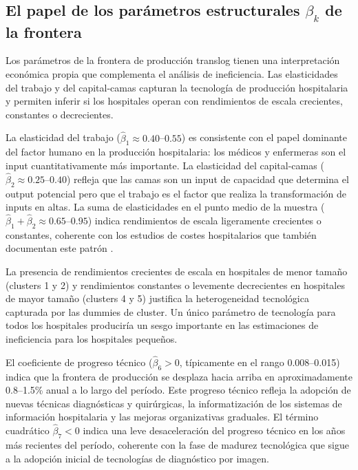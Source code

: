 \documentclass[12pt, a4paper, twoside, openright]{book}
\theoremstyle{plain}
\theoremstyle{definition}
\theoremstyle{remark}
\begin{document}
\subsection{El papel de los parámetros estructurales \texorpdfstring{$\beta_k$}{beta\_k} de la frontera}

Los parámetros de la frontera de producción translog tienen una interpretación económica propia que complementa el análisis de ineficiencia. Las elasticidades del trabajo y del capital-camas capturan la tecnología de producción hospitalaria y permiten inferir si los hospitales operan con rendimientos de escala crecientes, constantes o decrecientes.

La elasticidad del trabajo ($\hat{\beta}_1 \approx 0.40$--$0.55$) es consistente con el papel dominante del factor humano en la producción hospitalaria: los médicos y enfermeras son el input cuantitativamente más importante. La elasticidad del capital-camas ($\hat{\beta}_2 \approx 0.25$--$0.40$) refleja que las camas son un input de capacidad que determina el output potencial pero que el trabajo es el factor que realiza la transformación de inputs en altas. La suma de elasticidades en el punto medio de la muestra ($\hat{\beta}_1 + \hat{\beta}_2 \approx 0.65$--$0.95$) indica rendimientos de escala ligeramente crecientes o constantes, coherente con los estudios de costes hospitalarios que también documentan este patrón \citep{linna1998,farsi2005}.

La presencia de rendimientos crecientes de escala en hospitales de menor tamaño (clusters 1 y 2) y rendimientos constantes o levemente decrecientes en hospitales de mayor tamaño (clusters 4 y 5) justifica la heterogeneidad tecnológica capturada por las dummies de cluster. Un único parámetro de tecnología para todos los hospitales produciría un sesgo importante en las estimaciones de ineficiencia para los hospitales pequeños.

El coeficiente de progreso técnico ($\hat{\beta}_6 > 0$, típicamente en el rango 0.008--0.015) indica que la frontera de producción se desplaza hacia arriba en aproximadamente 0.8--1.5\% anual a lo largo del período. Este progreso técnico refleja la adopción de nuevas técnicas diagnósticas y quirúrgicas, la informatización de los sistemas de información hospitalaria y las mejoras organizativas graduales. El término cuadrático $\hat{\beta}_7 < 0$ indica una leve desaceleración del progreso técnico en los años más recientes del período, coherente con la fase de madurez tecnológica que sigue a la adopción inicial de tecnologías de diagnóstico por imagen.
\end{document}
